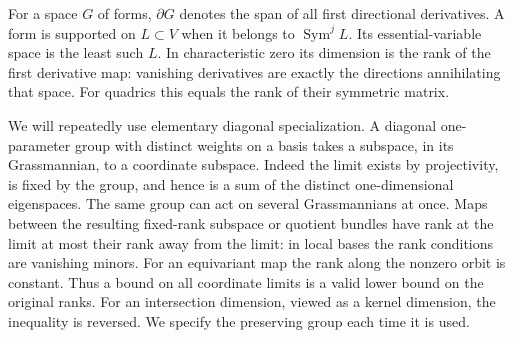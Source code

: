 \documentclass[11pt]{amsart}
\theoremstyle{remark}\newtheorem{remark}[theorem]{Remark}
\numberwithin{equation}{section}
\newcommand{\Sym}{\operatorname{Sym}}
\newcommand{\dd}{\partial}
\begin{document}
For a space $G$ of forms, $\dd G$ denotes the span of all first directional
derivatives. A form is supported on $L\subset V$ when it belongs to
$\Sym^j L$. Its essential-variable space is the least such $L$.
In characteristic zero its dimension is the rank of the first derivative
map: vanishing derivatives are exactly the directions annihilating that
space. For quadrics this equals the rank of their symmetric matrix.

We will repeatedly use elementary diagonal specialization. A diagonal
one-parameter group with distinct weights on a basis takes a subspace,
in its Grassmannian, to a coordinate subspace. Indeed the limit exists by
projectivity, is fixed by the group, and hence is a sum of the distinct
one-dimensional eigenspaces. The same group can act on several Grassmannians
at once. Maps between the resulting fixed-rank subspace or quotient bundles
have rank at the limit at most their rank away from the limit: in local
bases the rank conditions are vanishing minors. For an equivariant map the
rank along the nonzero orbit is constant. Thus a bound on all
coordinate limits is a valid lower bound on the original ranks. For an
intersection dimension, viewed as a kernel dimension, the inequality is
reversed. We specify the preserving group each time it is used.
\end{document}
